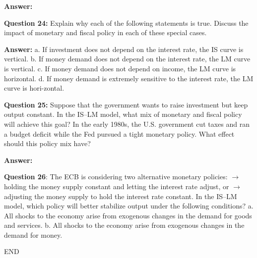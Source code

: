 \documentclass[a4paper, 11pt]{article}
\begin{document}
\textbf{Answer:} 


\textbf{Question 24:} Explain why each of the following statements is true. Discuss the impact of monetary and fiscal policy in each of these special cases.

\textbf{Answer:} 
a. If investment does not depend on the interest rate, the IS curve is vertical.
b. If money demand does not depend on the interest rate, the LM curve is vertical.
c. If money demand does not depend on income, the LM curve is horizontal.
d. If money demand is extremely sensitive to the interest rate, the LM curve is hori-zontal.

\textbf{Question 25:} Suppose that the government wants to raise investment but keep output constant. In the IS–LM model, what mix of monetary and fiscal policy will achieve this goal? In the early 1980s, the U.S. government cut taxes and ran a budget deficit while the Fed pursued a tight monetary policy. What effect should this policy mix have?

\textbf{Answer:} 

\textbf{Question 26}: The ECB is considering two alternative monetary policies:
$\rightarrow$ holding the money supply constant and letting the interest rate adjust, or
$\rightarrow$ adjusting the money supply to hold the interest rate constant.
In the IS–LM model, which policy will better stabilize output under the following conditions?
a. All shocks to the economy arise from exogenous changes in the demand for goods and services.
b. All shocks to the economy arise from exogenous changes in the demand for money.

\centering
END
\end{document}
